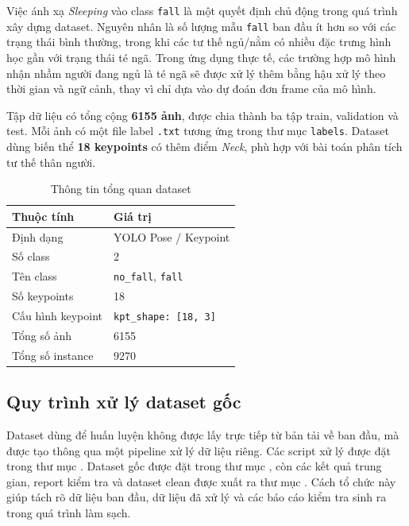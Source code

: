 \documentclass[12pt, a4paper]{article}
\begin{document}
Việc ánh xạ \textit{Sleeping} vào class \texttt{fall} là một quyết định chủ động trong quá trình xây dựng dataset.
Nguyên nhân là số lượng mẫu \texttt{fall} ban đầu ít hơn so với các trạng thái bình thường, trong khi các tư thế ngủ/nằm có nhiều đặc trưng hình học gần với trạng thái té ngã.
Trong ứng dụng thực tế, các trường hợp mô hình nhận nhầm người đang ngủ là té ngã sẽ được xử lý thêm bằng hậu xử lý theo thời gian và ngữ cảnh, thay vì chỉ dựa vào dự đoán đơn frame của mô hình.

Tập dữ liệu có tổng cộng \textbf{6155 ảnh}, được chia thành ba tập train, validation và test.
Mỗi ảnh có một file label \texttt{.txt} tương ứng trong thư mục \texttt{labels}.
Dataset dùng biến thể \textbf{18 keypoints} có thêm điểm \textit{Neck}, phù hợp với bài toán phân tích tư thế thân người.

\begin{table}[H]
  \centering
  \caption{Thông tin tổng quan dataset}
  \label{tab:dataset_overview}
  \begin{tabular}{@{}ll@{}}
    \toprule
    \textbf{Thuộc tính} & \textbf{Giá trị} \\
    \midrule
    Định dạng & YOLO Pose / Keypoint \\
    Số class & 2 \\
    Tên class & \texttt{no\_fall}, \texttt{fall} \\
    Số keypoints & 18 \\
    Cấu hình keypoint & \texttt{kpt\_shape: [18, 3]} \\
    Tổng số ảnh & 6155 \\
    Tổng số instance & 9270 \\
    \bottomrule
  \end{tabular}
\end{table}

\subsection{Quy trình xử lý dataset gốc}

Dataset dùng để huấn luyện không được lấy trực tiếp từ bản tải về ban đầu, mà được tạo thông qua một pipeline xử lý dữ liệu riêng.
Các script xử lý được đặt trong thư mục .
Dataset gốc được đặt trong thư mục , còn các kết quả trung gian, report kiểm tra và dataset clean được xuất ra thư mục .
Cách tổ chức này giúp tách rõ dữ liệu ban đầu, dữ liệu đã xử lý và các báo cáo kiểm tra sinh ra trong quá trình làm sạch.
\end{document}
